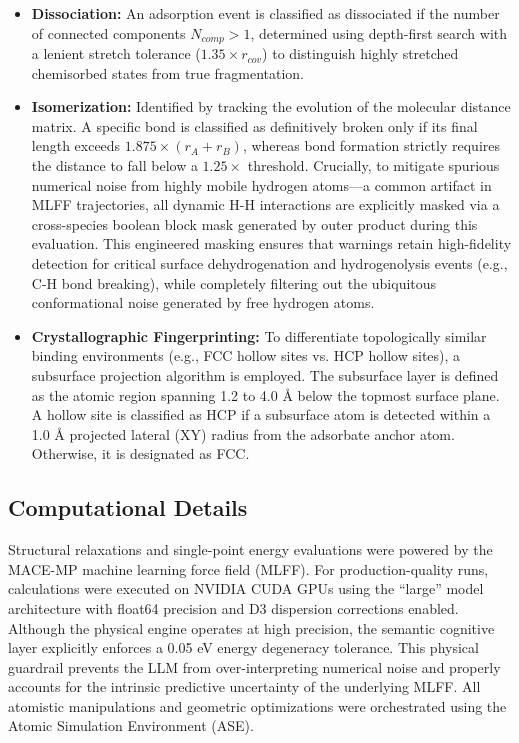 \documentclass{article}
\begin{document}
\begin{itemize}
    \item \textbf{Dissociation:} An adsorption event is classified as dissociated if the number of connected components $N_{comp} > 1$, determined using depth-first search with a lenient stretch tolerance ($1.35\times r_{cov}$) to distinguish highly stretched chemisorbed states from true fragmentation.
    \item \textbf{Isomerization:} Identified by tracking the evolution of the molecular distance matrix. A specific bond is classified as definitively broken only if its final length exceeds $1.875\times (r_{A} + r_{B})$, whereas bond formation strictly requires the distance to fall below a $1.25\times$ threshold. Crucially, to mitigate spurious numerical noise from highly mobile hydrogen atoms---a common artifact in MLFF trajectories, all dynamic H-H interactions are explicitly masked via a cross-species boolean block mask generated by outer product during this evaluation. This engineered masking ensures that warnings retain high-fidelity detection for critical surface dehydrogenation and hydrogenolysis events (e.g., C-H bond breaking), while completely filtering out the ubiquitous conformational noise generated by free hydrogen atoms.
    \item \textbf{Crystallographic Fingerprinting:} To differentiate topologically similar binding environments (e.g., FCC hollow sites vs. HCP hollow sites), a subsurface projection algorithm is employed. The subsurface layer is defined as the atomic region spanning 1.2 to 4.0 \AA{} below the topmost surface plane. A hollow site is classified as HCP if a subsurface atom is detected within a 1.0 \AA{} projected lateral (XY) radius from the adsorbate anchor atom. Otherwise, it is designated as FCC.
\end{itemize}

\subsection{Computational Details}
Structural relaxations and single-point energy evaluations were powered by the MACE-MP machine learning force field (MLFF). For production-quality runs, calculations were executed on NVIDIA CUDA GPUs using the ``large'' model architecture with float64 precision and D3 dispersion corrections enabled. Although the physical engine operates at high precision, the semantic cognitive layer explicitly enforces a 0.05 eV energy degeneracy tolerance. This physical guardrail prevents the LLM from over-interpreting numerical noise and properly accounts for the intrinsic predictive uncertainty of the underlying MLFF. All atomistic manipulations and geometric optimizations were orchestrated using the Atomic Simulation Environment (ASE).
\end{document}
